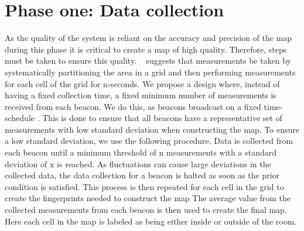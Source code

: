 \section{Phase one: Data collection}\label{sec:knn_implementation}
As the quality of the system is reliant on the accuracy and precision of the map during this phase it is critical to create a map of high quality.
Therefore, steps must be taken to ensure this quality. 
\citeauthor{improving_indoor_localization}~\cite{improving_indoor_localization} suggests that measurements be taken by systematically partitioning the area in a grid and then performing measurements for each cell of the grid for n-seconds. 
We propose a design where, instead of having a fixed collection time, a fixed minimum number of measurements is received from each beacon.
We do this, as beacons broadcast on a fixed time-schedule \cite{apple2023ibeacon}.
This is done to ensure that all beacons have a representative set of measurements with low standard deviation when constructing the map.
To ensure a low standard deviation, we use the following procedure.
Data is collected from each beacon until a minimum threshold of n measurements with a standard deviation of x is reached.
As fluctuations can cause large deviations in the collected data, the data collection for a beacon is halted as soon as the prior condition is satisfied.
This process is then repeated for each cell in the grid to create the fingerprints needed to construct the map 
The average value from the collected measurements from each beacon is then used to create the final map. 
Here each cell in the map is labeled as being either inside or outside of the room. 


